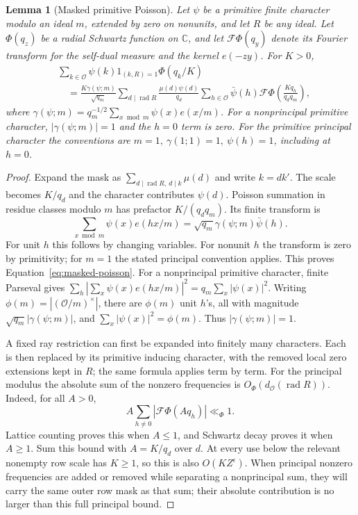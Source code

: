 \documentclass[11pt,a4paper]{article}
\numberwithin{equation}{section}
\numberwithin{figure}{section}
\newtheorem{lemma}[theorem]{Lemma}
\theoremstyle{definition}
\theoremstyle{remark}
\begin{document}
\begin{lemma}[Masked primitive Poisson]\label{lem:masked-poisson}
Let \(\psi\) be a primitive finite character modulo an ideal \(m\),
extended by zero on nonunits, and let \(R\) be any ideal.  Let
\(\Phi(q_z)\) be a radial Schwartz function on \(\mathbb C\), and
let \(\mathcal F\Phi(q_y)\) denote its Fourier transform for the
self-dual measure and the kernel \(e(-zy)\).  For \(K>0\),
\begin{equation}\label{eq:masked-poisson}
 \begin{split}
 &\sum_{k\in\mathcal O}\psi(k)1_{(k,R)=1}\Phi(q_k/K)\\
 &\quad=\frac{K\gamma(\psi;m)}{\sqrt{q_m}}
 \sum_{d\mid\operatorname{rad}R}\frac{\mu(d)\psi(d)}{q_d}
 \sum_{h\in\mathcal O}\bar\psi(h)
       \mathcal F\Phi\!\left(\frac{Kq_h}{q_dq_m}\right),
 \end{split}
\end{equation}
where
\(\gamma(\psi;m)=q_m^{-1/2}\sum_{x\bmod m}\psi(x)e(x/m)\).
For a nonprincipal primitive character, \(|\gamma(\psi;m)|=1\) and the
\(h=0\) term is zero.  For the primitive principal character the
conventions are \(m=1,\ \gamma(1;1)=1,\ \psi(h)=1\), including at
\(h=0\).
\end{lemma}

\begin{proof}
Expand the mask as
\(\sum_{d\mid\operatorname{rad}R,\ d\mid k}\mu(d)\) and write \(k=dk'\).
The scale becomes \(K/q_d\) and the character contributes \(\psi(d)\).
Poisson summation in residue classes modulo \(m\) has prefactor
\(K/(q_dq_m)\).  Its finite transform is
\[
 \sum_{x\bmod m}\psi(x)e(hx/m)
   =\sqrt{q_m}\gamma(\psi;m)\bar\psi(h).
\]
For unit \(h\) this follows by changing variables.  For nonunit \(h\)
the transform is zero by primitivity; for \(m=1\) the stated principal
convention applies.  This proves Equation~\eqref{eq:masked-poisson}.
For a nonprincipal primitive character, finite Parseval gives
\(\sum_h|\sum_x\psi(x)e(hx/m)|^2=q_m\sum_x|\psi(x)|^2\).
Writing \(\phi(m)=|(\mathcal O/m)^\times|\), there are \(\phi(m)\)
unit \(h\)'s, all with magnitude
\(\sqrt{q_m}|\gamma(\psi;m)|\), and
\(\sum_x|\psi(x)|^2=\phi(m)\).  Thus \(|\gamma(\psi;m)|=1\).

A fixed ray restriction can first be expanded into finitely many
characters.  Each is then replaced by its primitive inducing character,
with the removed local zero extensions kept in \(R\); the same formula
applies term by term.  For the principal modulus the absolute sum of
the nonzero frequencies is \(O_\Phi(d_{\mathcal O}(\operatorname{rad}R))\).
Indeed, for all \(A>0\),
\[
 A\sum_{h\ne0}|\mathcal F\Phi(Aq_h)|\ll_\Phi1.
\]
Lattice counting proves this when \(A\le1\), and Schwartz decay proves
it when \(A\ge1\).  Sum this bound with \(A=K/q_d\) over \(d\).
At every use below the relevant nonempty row scale has \(K\ge1\), so
this is also \(O(KZ^\epsilon)\).  When principal nonzero frequencies
are added or removed while separating a nonprincipal sum, they will
carry the same outer row mask as that sum; their absolute contribution
is no larger than this full principal bound.
\end{proof}
\end{document}
